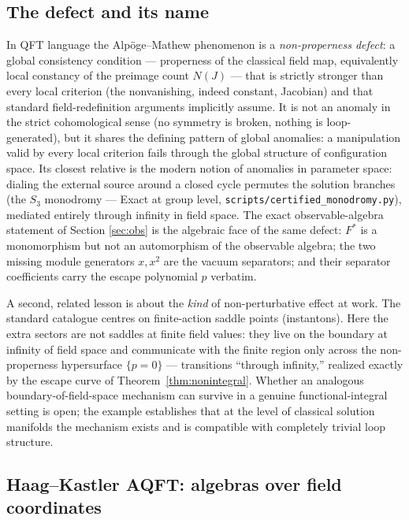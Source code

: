 \documentclass[11pt]{article}
\theoremstyle{definition}
\theoremstyle{remark}
\begin{document}
\subsection{The defect and its name}

In QFT language the Alp\"oge--Mathew phenomenon is a
\emph{non-properness defect}: a global consistency condition ---
properness of the classical field map, equivalently local constancy of
the preimage count $N(J)$ --- that is strictly stronger than every
local criterion (the nonvanishing, indeed constant, Jacobian) and that
standard field-redefinition arguments implicitly assume. It is not an
anomaly in the strict cohomological sense (no symmetry is broken,
nothing is loop-generated), but it shares the defining pattern of
global anomalies: a manipulation valid by every local criterion fails
through the global structure of configuration space. Its closest
relative is the modern notion of anomalies in parameter space: dialing
the external source around a closed cycle permutes the solution
branches (the $S_3$ monodromy --- Exact at group level,
\texttt{scripts/certified\_monodromy.py}), mediated entirely through infinity in
field space. The exact observable-algebra statement of Section
\ref{sec:obs} is the algebraic face of the same defect: $F^*$ is a
monomorphism but not an automorphism of the observable algebra; the
two missing module generators $x,x^2$ are the vacuum separators; and
their separator coefficients carry the escape polynomial $p$ verbatim.

A second, related lesson is about the \emph{kind} of non-perturbative
effect at work. The standard catalogue centres on finite-action saddle
points (instantons). Here the extra sectors are not saddles at finite
field values: they live on the boundary at infinity of field space and
communicate with the finite region only across the non-properness
hypersurface $\{p=0\}$ --- transitions ``through infinity,'' realized
exactly by the escape curve of Theorem~\ref{thm:nonintegral}. Whether
an analogous boundary-of-field-space mechanism can survive in a genuine
functional-integral setting is open; the example establishes that at
the level of classical solution manifolds the mechanism exists and is
compatible with completely trivial loop structure.

\subsection{Haag--Kastler AQFT: algebras over field coordinates}
\label{sec:aqft}
\end{document}
